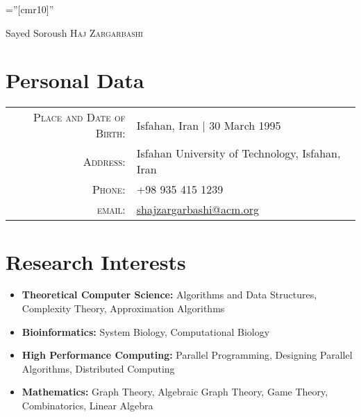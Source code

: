 \documentclass[a4paper,10pt]{article}
\begin{document}

\pagestyle{empty} %

\font\fb=''[cmr10]'' %

\par{\centering
		{\small Sayed \Huge Soroush \textsc{Haj Zargarbashi}
	}\bigskip\par}

\section{Personal Data}

\begin{tabular}{rl}
    \textsc{Place and Date of Birth:} & Isfahan, Iran  | 30 March 1995 \\
    \textsc{Address:}   & Isfahan University of Technology, Isfahan, Iran \\
    \textsc{Phone:}     & +98 935 415 1239\\
    \textsc{email:}     &  \href{mailto:shajzargarbashi@acm.org}{shajzargarbashi@acm.org}
\end{tabular}

\section{Research Interests}
\begin{itemize}
	\item \textbf{Theoretical Computer Science:} Algorithms and Data Structures, Complexity Theory, Approximation Algorithms
	\item \textbf{Bioinformatics:} System Biology, Computational Biology 
	\item \textbf{High Performance Computing:} Parallel Programming, Designing Parallel Algorithms, Distributed Computing 
	\item \textbf{Mathematics:} Graph Theory, Algebraic Graph Theory, Game Theory, Combinatorics, Linear Algebra
	
\end{itemize}
\end{document}
